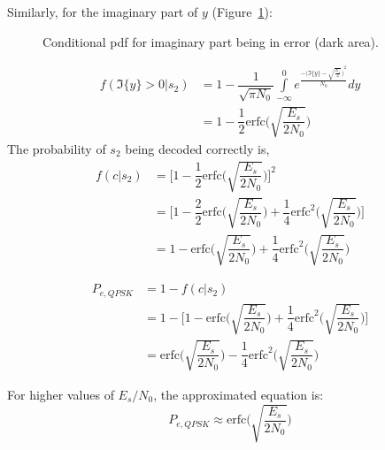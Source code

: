 	Similarly, for the imaginary part of $ y $ (Figure~\ref{figII:Ipdf}):
	\begin{figure}[htb]
	\centering
	\def\svgwidth{0.5\textwidth} %
	
	\caption{Conditional pdf for imaginary part being in error (dark area).}
	\label{figII:Ipdf}
	\end{figure}
	
		\begin{align}
		f(\Im\{y\} > 0|s_2 )&=1-\dfrac{1}{\sqrt{\pi N_0}}\int\limits_{-\infty}^{0}e^{\frac{{-\big (\Im \{y\}-\sqrt{\frac{E_s}{2}}\big )}^2}{N_0}}dy\\
		&=1-\dfrac{1}{2}\text{erfc}\Big( \sqrt{\dfrac{E_s}{2N_0}} \Big)
		\end{align}
The probability of $ s_2 $ being decoded correctly is,
\begin{align}
f(c|s_2)&=\Big[ 1-\dfrac{1}{2}\text{erfc}\Big( \sqrt{\dfrac{E_s}{2N_0}} \Big)\Big]^2\\
&=\Big[ 1-\dfrac{2}{2}\text{erfc}\Big( \sqrt{\dfrac{E_s}{2N_0}} \Big)+\dfrac{1}{4}\text{erfc}^2\Big( \sqrt{\dfrac{E_s}{2N_0}} \Big) \Big]\\
&=1-\text{erfc}\Big( \sqrt{\dfrac{E_s}{2N_0}} \Big)+\dfrac{1}{4}\text{erfc}^2\Big( \sqrt{\dfrac{E_s}{2N_0}} \Big)
\end{align}

\begin{align}
P_{e,QPSK}&=1-f(c|s_2)\\
&=1-\Big[ 1-\text{erfc}\Big( \sqrt{\dfrac{E_s}{2N_0}} \Big)+\dfrac{1}{4}\text{erfc}^2\Big( \sqrt{\dfrac{E_s}{2N_0}} \Big) \Big]\\
&=\text{erfc}\Big( \sqrt{\dfrac{E_s}{2N_0}} \Big)-\dfrac{1}{4}\text{erfc}^2\Big( \sqrt{\dfrac{E_s}{2N_0}} \Big)
\end{align}

For higher values of $ E_s/N_0 $, the approximated equation is:
\begin{equation}
P_{e,QPSK} \approx \text{erfc}\Big( \sqrt{\dfrac{E_s}{2N_0}} \Big)
\end{equation}
\clearpage


